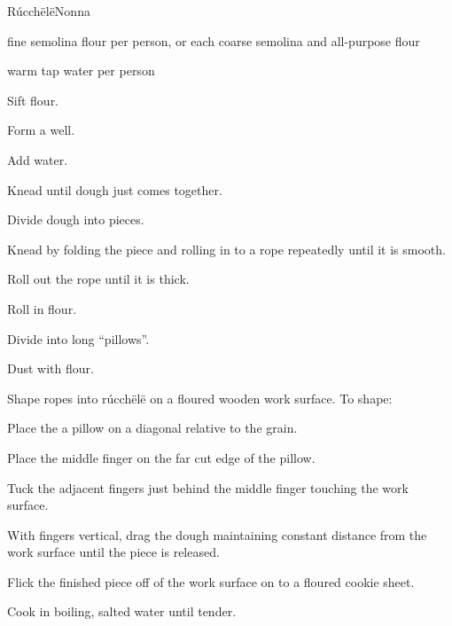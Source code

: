 \begin{recipe}{Rúcchëlë}{Nonna}{}

\begin{ingredients}
\item {} fine semolina flour per person, or  each coarse semolina and all-purpose flour
\item {} warm tap water per person
\end{ingredients}

\begin{directions}
\item Sift flour.
\item Form a well.
\item Add water.
\item Knead until dough just comes together.
\item Divide dough into pieces.
\item Knead by folding the piece and rolling in to a rope repeatedly until it is smooth.
\item Roll out the rope until it is \inch{\third} thick.
\item Roll in flour.
\item Divide into \inch{\threequarter} long ``pillows''.
\item Dust with flour.
\item Shape ropes into rúcchëlë on a floured wooden work surface. To shape:\par
\begin{enumerate*}
\item Place the a pillow on a diagonal relative to the grain.
\item Place the middle finger on the far cut edge of the pillow.
\item Tuck the adjacent fingers just behind the middle finger touching the work surface.
\item With fingers vertical, drag the dough maintaining constant distance from the work surface until the piece is released.
\item Flick the finished piece off of the work surface on to a floured cookie sheet.
\end{enumerate*}
\item Cook in boiling, salted water until tender.
\end{directions}

\end{recipe}
